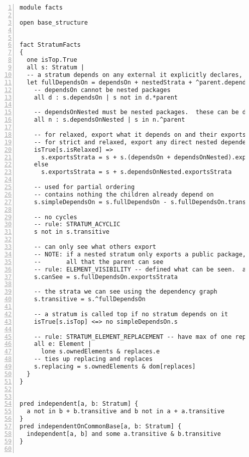 \lstset{frame=tb, aboveskip=12pt, belowskip=-3pt, breaklines=true, tabsize=2, mathescape=true}
\begin{lstlisting}[caption={base\_facts.als}, numbers=left]
module facts

open base_structure


fact StratumFacts
{
  one isTop.True
  all s: Stratum |
  -- a stratum depends on any external it explicitly declares, plus any nested strata
  let fullDependsOn = dependsOn + nestedStrata + ^parent.dependsOn {
    -- dependsOn cannot be nested packages
    all d : s.dependsOn | s not in d.*parent
    
    -- dependsOnNested must be nested packages.  these can be deeply nested also.
    all n : s.dependsOnNested | s in n.^parent
  
    -- for relaxed, export what it depends on and their exports
    -- for strict and relaxed, export any direct nested dependencies
    isTrue[s.isRelaxed] =>
      s.exportsStrata = s + s.(dependsOn + dependsOnNested).exportsStrata
    else
      s.exportsStrata = s + s.dependsOnNested.exportsStrata

    -- used for partial ordering
    -- contains nothing the children already depend on
    s.simpleDependsOn = s.fullDependsOn - s.fullDependsOn.transitive

    -- no cycles
    -- rule: STRATUM_ACYCLIC
    s not in s.transitive

    -- can only see what others export
    -- NOTE: if a nested stratum only exports a public package, then this is 
    --       all that the parent can see
    -- rule: ELEMENT_VISIBILITY -- defined what can be seen.  augmented by other checks
    s.canSee = s.fullDependsOn.exportsStrata
  
    -- the strata we can see using the dependency graph
    s.transitive = s.^fullDependsOn

    -- a stratum is called top if no stratum depends on it
    isTrue[s.isTop] <=> no simpleDependsOn.s
    
    -- rule: STRATUM_ELEMENT_REPLACEMENT -- have max of one replacement of an element per stratum
    all e: Element |
      lone s.ownedElements & replaces.e
    -- ties up replacing and replaces
    s.replacing = s.ownedElements & dom[replaces]
  }
}


pred independent[a, b: Stratum] {
  a not in b + b.transitive and b not in a + a.transitive
}
pred independentOnCommonBase[a, b: Stratum] {
  independent[a, b] and some a.transitive & b.transitive
}


\end{lstlisting}
